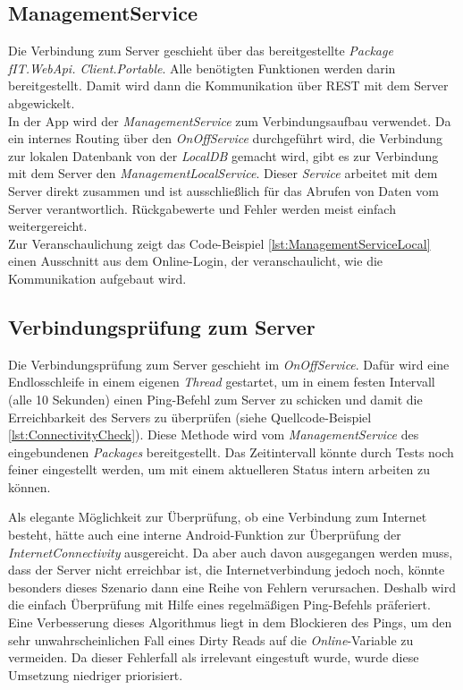 \subsection{ManagementService}
\label{ssec:nat-ManagementServiceLocal}
Die Verbindung zum Server geschieht über das bereitgestellte \textit{Package} \linebreak \textit{fIT.WebApi. Client.Portable}. Alle benötigten Funktionen werden darin bereitgestellt. Damit wird dann die Kommunikation über REST mit dem Server abgewickelt.\\
In der App wird der \textit{ManagementService} zum Verbindungsaufbau verwendet. Da ein internes Routing über den \textit{OnOffService} durchgeführt wird, die Verbindung zur lokalen Datenbank von der \textit{LocalDB} gemacht wird, gibt es zur Verbindung mit dem Server den \textit{ManagementLocalService}. Dieser \textit{Service} arbeitet mit dem Server direkt zusammen und ist ausschließlich für das Abrufen von Daten vom Server verantwortlich. Rückgabewerte und Fehler werden meist einfach weitergereicht.\\
Zur Veranschaulichung zeigt das Code-Beispiel \ref{lst:ManagementServiceLocal} einen Ausschnitt aus dem Online-Login, der veranschaulicht, wie die Kommunikation aufgebaut wird.

\subsection{Verbindungsprüfung zum Server}
\label{ssec:nat-konnektivität}
Die Verbindungsprüfung zum Server geschieht im \textit{OnOffService}. Dafür wird eine Endlosschleife in einem eigenen \textit{Thread} gestartet, um in einem festen Intervall (alle 10 Sekunden) einen Ping-Befehl zum Server zu schicken und damit die Erreichbarkeit des Servers zu überprüfen (siehe Quellcode-Beispiel \ref{lst:ConnectivityCheck}). Diese Methode wird vom \textit{ManagementService} des eingebundenen \textit{Packages} bereitgestellt. Das Zeitintervall könnte durch Tests noch feiner eingestellt werden, um mit einem aktuelleren Status intern arbeiten zu können.

Als elegante Möglichkeit zur Überprüfung, ob eine Verbindung zum Internet besteht, hätte auch eine interne \gls{Android}-Funktion zur Überprüfung der \textit{InternetConnectivity} ausgereicht. Da aber auch davon ausgegangen werden muss, dass der Server nicht erreichbar ist, die Internetverbindung jedoch noch, könnte besonders dieses Szenario dann eine Reihe von Fehlern verursachen. Deshalb wird die einfach Überprüfung mit Hilfe eines regelmäßigen Ping-Befehls präferiert.\\
Eine Verbesserung dieses Algorithmus liegt in dem Blockieren des Pings, um den sehr unwahrscheinlichen Fall eines \glspl{Dirty Read} auf die \textit{Online}-Variable zu vermeiden. Da dieser Fehlerfall als irrelevant eingestuft wurde, wurde diese Umsetzung niedriger priorisiert.
